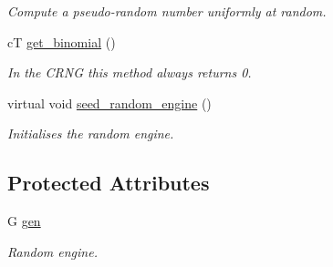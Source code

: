 \begin{DoxyCompactItemize}
\begin{DoxyCompactList}\small\item\em Compute a pseudo-\/random number uniformly at random. \end{DoxyCompactList}\item 
\hypertarget{classlgraph_1_1utils_1_1crandom__generator_ac1f724180b858b6a1f67451060de6896}{c\-T \hyperlink{classlgraph_1_1utils_1_1crandom__generator_ac1f724180b858b6a1f67451060de6896}{get\-\_\-binomial} ()}\label{classlgraph_1_1utils_1_1crandom__generator_ac1f724180b858b6a1f67451060de6896}

\begin{DoxyCompactList}\small\item\em In the C\-R\-N\-G this method always returns 0. \end{DoxyCompactList}\item 
\hypertarget{classlgraph_1_1utils_1_1random__generator_a4eb6998070eecb59bd89dca92d8a509c}{virtual void \hyperlink{classlgraph_1_1utils_1_1random__generator_a4eb6998070eecb59bd89dca92d8a509c}{seed\-\_\-random\-\_\-engine} ()}\label{classlgraph_1_1utils_1_1random__generator_a4eb6998070eecb59bd89dca92d8a509c}

\begin{DoxyCompactList}\small\item\em Initialises the random engine. \end{DoxyCompactList}\end{DoxyCompactItemize}
\subsection*{Protected Attributes}
\begin{DoxyCompactItemize}
\item 
\hypertarget{classlgraph_1_1utils_1_1random__generator_a18353876b4c2d3a18aee454b5750a0a0}{G \hyperlink{classlgraph_1_1utils_1_1random__generator_a18353876b4c2d3a18aee454b5750a0a0}{gen}}\label{classlgraph_1_1utils_1_1random__generator_a18353876b4c2d3a18aee454b5750a0a0}

\begin{DoxyCompactList}\small\item\em Random engine. \end{DoxyCompactList}\end{DoxyCompactItemize}
